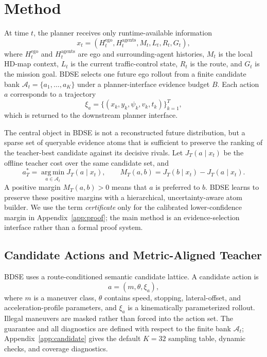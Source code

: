 \documentclass{article}
\newcommand{\A}{\mathcal{A}}
\newcommand{\argmin}{\operatorname*{arg\,min}}
\begin{document}
\section{Method}
\label{sec:method}

At time $t$, the planner receives only runtime-available information
\begin{equation}
    x_t=(H_t^{\mathrm{ego}},H_t^{\mathrm{agents}},M_t,L_t,R_t,G_t),
\end{equation}
where $H_t^{\mathrm{ego}}$ and $H_t^{\mathrm{agents}}$ are ego and surrounding-agent histories, $M_t$ is the local HD-map context, $L_t$ is the current traffic-control state, $R_t$ is the route, and $G_t$ is the mission goal. BDSE selects one future ego rollout from a finite candidate bank $\A_t=\{a_1,\ldots,a_K\}$ under a planner-interface evidence budget $B$. Each action $a$ corresponds to a trajectory
\begin{equation}
    \xi_a=\{(x_k,y_k,\psi_k,v_k,t_k)\}_{k=1}^{T},
\end{equation}
which is returned to the downstream planner interface.

The central object in BDSE is not a reconstructed future distribution, but a sparse set of queryable evidence atoms that is sufficient to preserve the ranking of the teacher-best candidate against its decisive rivals. Let $J_T(a\mid x_t)$ be the offline teacher cost over the same candidate set, and
\begin{equation}
    a_T^*=\argmin_{a\in\A_t}J_T(a\mid x_t),\qquad
    M_T(a,b)=J_T(b\mid x_t)-J_T(a\mid x_t).
    \label{eq:teacher_action_margin}
\end{equation}
A positive margin $M_T(a,b)>0$ means that $a$ is preferred to $b$. BDSE learns to preserve these positive margins with a hierarchical, uncertainty-aware atom builder. We use the term \emph{certificate} only for the calibrated lower-confidence margin in Appendix~\ref{app:proof}; the main method is an evidence-selection interface rather than a formal proof system.

\subsection{Candidate Actions and Metric-Aligned Teacher}
\label{sec:candidate_teacher}

BDSE uses a route-conditioned semantic candidate lattice. A candidate action is
\begin{equation}
    a=(m,\theta,\xi_a),
\end{equation}
where $m$ is a maneuver class, $\theta$ contains speed, stopping, lateral-offset, and acceleration-profile parameters, and $\xi_a$ is a kinematically parameterized rollout. Illegal maneuvers are masked rather than forced into the action set. The guarantee and all diagnostics are defined with respect to the finite bank $\A_t$; Appendix~\ref{app:candidate} gives the default $K=32$ sampling table, dynamic checks, and coverage diagnostics.
\end{document}
